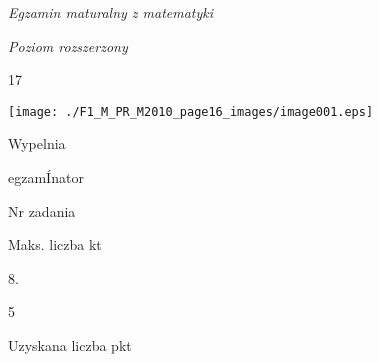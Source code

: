 \documentclass[a4paper,12pt]{article}
\begin{document}
{\it Egzamin maturalny z matematyki}

{\it Poziom rozszerzony}

17
\begin{center}
\texttt{[image: ./F1\_M\_PR\_M2010\_page16\_images/image001.eps]}
\end{center}
Wypelnia

egzamÍnator

Nr zadania

Maks. liczba kt

8.

5

Uzyskana liczba pkt
\end{document}
